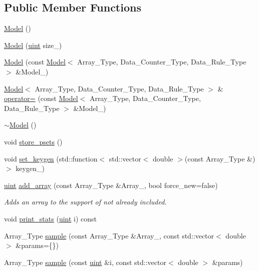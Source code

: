 \subsection*{Public Member Functions}
\begin{DoxyCompactItemize}
\item 
\hyperlink{class_model_a29e6e0c37d9a892772c5ee95ce1e1043}{Model} ()
\item 
\hyperlink{class_model_a46639bb435ca2992dac8858528a5362e}{Model} (\hyperlink{typedefs_8hpp_a91ad9478d81a7aaf2593e8d9c3d06a14}{uint} size\+\_\+)
\item 
\hyperlink{class_model_a047905a921baa9e51a4f07d337379375}{Model} (const \hyperlink{class_model}{Model}$<$ Array\+\_\+\+Type, Data\+\_\+\+Counter\+\_\+\+Type, Data\+\_\+\+Rule\+\_\+\+Type $>$ \&Model\+\_\+)
\item 
\hyperlink{class_model}{Model}$<$ Array\+\_\+\+Type, Data\+\_\+\+Counter\+\_\+\+Type, Data\+\_\+\+Rule\+\_\+\+Type $>$ \& \hyperlink{class_model_a4944b5918dc4a9a59f72587da1e6bb3a}{operator=} (const \hyperlink{class_model}{Model}$<$ Array\+\_\+\+Type, Data\+\_\+\+Counter\+\_\+\+Type, Data\+\_\+\+Rule\+\_\+\+Type $>$ \&Model\+\_\+)
\item 
\hyperlink{class_model_a0eba131af14e1ceefc7748323e9fb4bf}{$\sim$\+Model} ()
\item 
void \hyperlink{class_model_a06a6f52dfc6868908cf11e6663a93904}{store\+\_\+psets} ()
\item 
void \hyperlink{class_model_add1847cdaf3f5bbde6c14efc2e4d16df}{set\+\_\+keygen} (std\+::function$<$ std\+::vector$<$ double $>$(const Array\+\_\+\+Type \&)$>$ keygen\+\_\+)
\item 
\hyperlink{typedefs_8hpp_a91ad9478d81a7aaf2593e8d9c3d06a14}{uint} \hyperlink{class_model_a17a2205b52c03bb29eefb8fb126a01f6}{add\+\_\+array} (const Array\+\_\+\+Type \&Array\+\_\+, bool force\+\_\+new=false)
\begin{DoxyCompactList}\small\item\em Adds an array to the support of not already included. \end{DoxyCompactList}\item 
void \hyperlink{class_model_ac00b5c6a1446ad00fdf1d92c9cb1df3c}{print\+\_\+stats} (\hyperlink{typedefs_8hpp_a91ad9478d81a7aaf2593e8d9c3d06a14}{uint} i) const
\item 
Array\+\_\+\+Type \hyperlink{class_model_a59e37db45e1751a6205db129a5c114c1}{sample} (const Array\+\_\+\+Type \&Array\+\_\+, const std\+::vector$<$ double $>$ \&params=\{\})
\item 
Array\+\_\+\+Type \hyperlink{class_model_a7fb66a67707f610b70ee05b814373f49}{sample} (const \hyperlink{typedefs_8hpp_a91ad9478d81a7aaf2593e8d9c3d06a14}{uint} \&i, const std\+::vector$<$ double $>$ \&params)
\end{DoxyCompactItemize}
